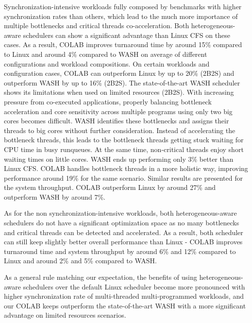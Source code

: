 Synchronization-intensive workloads fully composed by benchmarks with higher synchronization rates than others, which lead to the  much more importance of multiple bottlenecks and critical threads co-acceleration. Both heterogeneous-aware schedulers can show a significant advantage than Linux CFS on these cases. As a result, COLAB improves turnaround time by around 15\% compared to Linux and around 4\% compared to WASH on average of different configurations and workload compositions. On certain workloads and configuration cases, COLAB can outperform Linux by up to 20\% (2B2S) and outperform WASH by up to 16\% (2B2S). 
The state-of-the-art WASH scheduler shows its limitations when used on limited resources (2B2S). With increasing  pressure  from  co-executed  applications, properly  balancing  bottleneck  acceleration and core sensitivity across multiple programs using only two big cores becomes difficult. WASH identifies these bottlenecks and assigns their threads to big cores without further consideration. Instead of accelerating the bottleneck threads, this leads to the bottleneck threads getting stuck waiting for CPU time in busy runqueues. At the same time, non-critical threads enjoy short waiting times on little cores. WASH ends up performing only 3\% better than Linux CFS. COLAB handles bottleneck threads in a more holistic way, improving performance around 19\% for the same scenario.
Similar results are presented for the system throughput. COLAB outperform Linux by around 27\% and outperform WASH by around 7\%. 

As for the non synchronization-intensive workloads, both heterogeneous-aware schedulers do not have a significant optimization space as no many bottlenecks and critical threads can be detected and accelerated. As a result, both scheduler can still keep slightly better overall performance than Linux - COLAB improves turnaround time and system throughput by around 6\% and 12\% compared to Linux and around 2\% and 5\% compared to WASH.

As a general rule matching our expectation, the benefits of using heterogeneous-aware schedulers over the default Linux scheduler become more pronounced with higher synchronization rate of multi-threaded multi-programmed workloads, and our COLAB keeps outperform the state-of-the-art WASH with a more significant advantage on limited resources scenarios.

